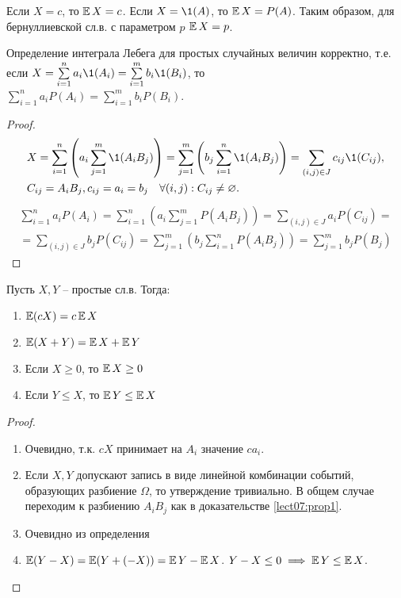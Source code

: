     \begin{example}
        Если $X = c$, то $\operatorname*{\mathbb{E}} X = c$. Если $X = \1 (A)$, то $\operatorname*{\mathbb{E}} X = P(A)$. Таким образом, для бернуллиевской сл.в. с параметром $p$ $\operatorname*{\mathbb{E}} X = p$.
    \end{example}
    
    \begin{prop}\label{lect07:prop1}
        Определение интеграла Лебега для простых случайных величин корректно, т.е. если $X=\sum\limits_{i=1}^{n} a_i \1 (A_i) =\sum\limits_{i=1}^{m} b_i \1 (B_i)$, то\\ $\sum\limits_{i=1}^{n} a_i P(A_i) = \sum\limits_{i=1}^{m} b_i P(B_i)$.
    \end{prop}
    \begin{proof}
        \begin{align*}
            &X=\sum\limits_{i=1}^{n}\left(a_i \sum\limits_{j=1}^{m} \1 (A_i B_j) \right) = \sum\limits_{j=1}^{m}\left(b_j \sum\limits_{i=1}^{n} \1 (A_i B_j) \right) = \sum\limits_{(i,j)\in J} c_{ij} \1 (C_{ij}), \\ &C_{ij}=A_i B_j, c_{ij} = a_i = b_j \quad \forall (i,j): C_{ij}\neq\varnothing.
        \end{align*}
        \begin{multline*}
            \sum\limits_{i=1}^{n} a_i P(A_i) = \sum\limits_{i=1}^{n}\left( a_i \sum\limits_{j=1}^{m} P(A_i B_j) \right) = \sum\limits_{(i,j)\in J} a_i P(C_{ij})=\\=\sum\limits_{(i,j)\in J} b_j P(C_{ij})=\sum\limits_{j=1}^{m}\left( b_j\sum\limits_{i=1}^{n} P(A_i B_j)\right)=\sum\limits_{j=1}^{m} b_j P(B_j)
        \end{multline*}
    \end{proof}
    
    \begin{theorem}\label{lect07:th1}
        Пусть $X,Y$ -- простые сл.в. Тогда:
        \begin{enumerate}
            \item $\operatorname*{\mathbb{E}}(cX) = c\operatorname*{\mathbb{E}} X$
            \item $\operatorname*{\mathbb{E}} (X+Y) = \operatorname*{\mathbb{E}} X +\operatorname*{\mathbb{E}} Y$
            \item Если $X\ge 0$, то $\operatorname*{\mathbb{E}} X \ge 0$
            \item Если $Y\le X$, то $\operatorname*{\mathbb{E}} Y \le \operatorname*{\mathbb{E}} X$
        \end{enumerate}
    \end{theorem}
    \begin{proof}
        \begin{enumerate}
            \item Очевидно, т.к. $cX$ принимает на $A_i$ значение $ca_i$.
            \item Если $X,Y$ допускают запись в виде линейной комбинации событий, образующих разбиение $\Omega$, то утверждение тривиально. В общем случае переходим к разбиению $A_i B_j$ как в доказательстве \ref{lect07:prop1}.
            \item Очевидно из определения
            \item $\operatorname*{\mathbb{E}} (Y-X) = \operatorname*{\mathbb{E}} (Y+(-X)) = \operatorname*{\mathbb{E}} Y - \operatorname*{\mathbb{E}} X$. $Y-X\le 0 \implies \operatorname*{\mathbb{E}} Y \le \operatorname*{\mathbb{E}} X$.
        \end{enumerate}
    \end{proof}
    
